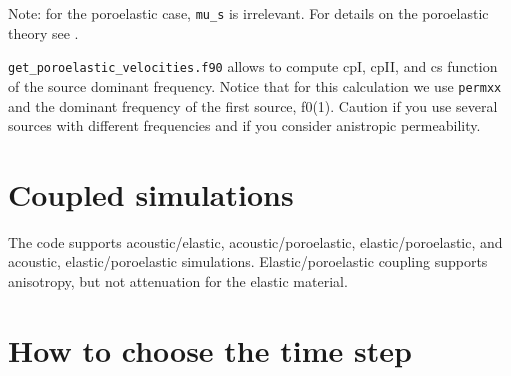 \begin{description}[style=nextline, labelindent=1em, font=\normalfont]
Note: for the poroelastic case, \texttt{mu\_s} is irrelevant.
For details on the poroelastic theory see \cite{MoTr08}.

\end{description}

\texttt{get\_poroelastic\_velocities.f90} allows to compute cpI, cpII, and cs function of
the source dominant frequency. Notice that for this calculation we use \texttt{permxx}
and the dominant frequency of the first source, f0(1). Caution if you use
several sources with different frequencies and if you consider anistropic
permeability.

\section{Coupled simulations}

The code supports acoustic/elastic, acoustic/poroelastic, elastic/poroelastic,
and acoustic, elastic/poroelastic simulations.
Elastic/poroelastic coupling supports anisotropy, but not attenuation for the
elastic material.


\section{How to choose the time step}

